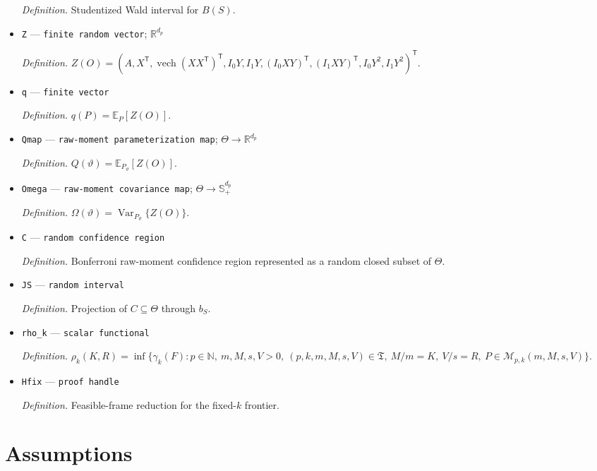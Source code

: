 \documentclass{article}
\begin{document}
\begin{itemize}
  \par\smallskip\noindent\emph{Definition.} Studentized Wald interval for \(B(S)\).
  \item \texttt{Z} --- \texttt{finite random vector}; \(\mathbb R^{d_p}\)
  \par\smallskip\noindent\emph{Definition.} \(Z(O)=(A,X^{\mathsf T},\operatorname{vech}(XX^{\mathsf T})^{\mathsf T},I_0Y,I_1Y,(I_0XY)^{\mathsf T},(I_1XY)^{\mathsf T},I_0Y^2,I_1Y^2)^{\mathsf T}\).
  \item \texttt{q} --- \texttt{finite vector}
  \par\smallskip\noindent\emph{Definition.} \(q(P)=\mathbb E_P[Z(O)]\).
  \item \texttt{Qmap} --- \texttt{raw-\allowbreak{}moment parameterization map}; \(\Theta\to\mathbb R^{d_p}\)
  \par\smallskip\noindent\emph{Definition.} \(Q(\vartheta)=\mathbb E_{P_{\vartheta}}[Z(O)]\).
  \item \texttt{Omega} --- \texttt{raw-\allowbreak{}moment covariance map}; \(\Theta\to\mathbb S_+^{d_p}\)
  \par\smallskip\noindent\emph{Definition.} \(\Omega(\vartheta)=\operatorname{Var}_{P_{\vartheta}}\{Z(O)\}\).
  \item \texttt{C} --- \texttt{random confidence region}
  \par\smallskip\noindent\emph{Definition.} Bonferroni raw-moment confidence region represented as a random closed subset of \(\Theta\).
  \item \texttt{JS} --- \texttt{random interval}
  \par\smallskip\noindent\emph{Definition.} Projection of \(C\subseteq\Theta\) through \(b_S\).
  \item \texttt{rho\_\allowbreak{}k} --- \texttt{scalar functional}
  \par\smallskip\noindent\emph{Definition.} \(\rho_k(K,R)=\inf\{\gamma_k(F):p\in\mathbb N,\ m,M,s,V>0,\ (p,k,m,M,s,V)\in\mathfrak T,\ M/m=K,\ V/s=R,\ P\in\mathcal M_{p,k}(m,M,s,V)\}\).
  \item \texttt{Hfix} --- \texttt{proof handle}
  \par\smallskip\noindent\emph{Definition.} Feasible-frame reduction for the fixed-\(k\) frontier.
\end{itemize}

\section{Assumptions}
\end{document}
